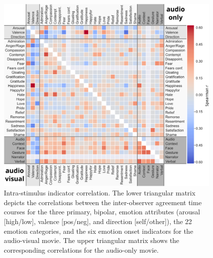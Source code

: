 \begin{figure}
  \centering
  \includegraphics[width=\linewidth]{figures/bigcorr}
  \caption{Intra-stimulus indicator correlation. The lower triangular matrix
    depicts the correlations between the inter-observer agreement time courses for
    the three primary, bipolar, emotion attributes (arousal [high/low], valence [pos/neg], and direction [self/other]), the
    22 emotion categories, and the six emotion onset indicators for the audio-visual
    movie. The upper triangular matrix shows the corresponding correlations for the
    audio-only movie.
 }
  \label{fig:intrastimcorrelation}
\end{figure}

